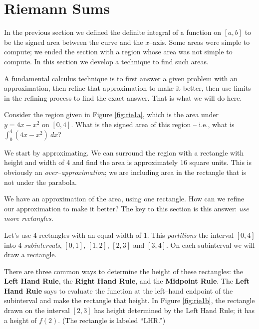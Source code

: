 \section{Riemann Sums}\label{sec:riemann}

In the previous section we defined the definite integral of a function on $[a,b]$ to be the signed area between the curve and the $x$--axis. Some areas were simple to compute; we ended the section with a region whose area was not simple to compute. In this section we develop a technique to find such areas.

A fundamental calculus technique is to first answer a given problem with an approximation, then refine that approximation to make it better, then use limits in the refining process to find the exact answer. That is  what we will do here.

Consider the region given in Figure \ref{fig:rie1a}, which is the area under $y=4x-x^2$ on $[0,4]$. What is the signed area of this region -- i.e., what is $\int_0^4(4x-x^2)\ dx$?


We start by approximating. We can surround the region with a rectangle with height and width of 4 and find the area is approximately 16 square units. This is obviously an \textit{over--approximation}; we are including area in the rectangle that is not under the parabola. 


We have an approximation of the area, using one rectangle. How can we refine our approximation to make it better? The key to this section is this answer: \textit{use more rectangles.}

Let's use 4 rectangles with an equal width of 1. This \textit{partitions} the interval $[0,4]$ into 4 \textit{subintervals}, $[0,1]$, $[1,2]$, $[2,3]$ and $[3,4]$. On each subinterval we will draw a rectangle.

There are three common ways to determine the height of these rectangles: the \textbf{Left Hand Rule}, the \textbf{Right Hand Rule}, and the \textbf{Midpoint Rule}. The \textbf{Left Hand Rule} says to evaluate the function at the left--hand endpoint of the subinterval and make the rectangle that height. In Figure \ref{fig:rie1b}, the rectangle drawn on the interval $[2,3]$ has height determined by the Left Hand Rule; it has a height of $f(2)$. (The rectangle is labeled ``LHR.'')

